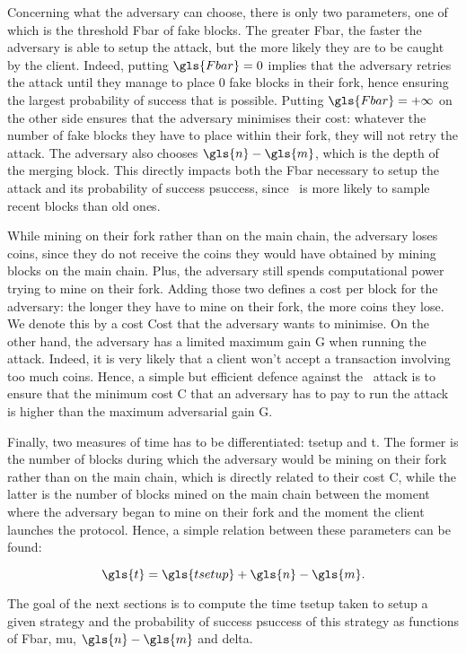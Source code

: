 Concerning what the adversary can choose, there is only two parameters, one of which is the threshold \gls{Fbar} of fake blocks. The greater \gls{Fbar}, the faster the adversary is able to setup the attack, but the more likely they are to be caught by the client. Indeed, putting \(\gls{Fbar}=0\) implies that the adversary retries the attack until they manage to place 0 fake blocks in their fork, hence ensuring the largest probability of success that is possible. Putting \(\gls{Fbar}=+\infty\) on the other side ensures that the adversary minimises their cost: whatever the number of fake blocks they have to place within their fork, they will not retry the attack. The adversary also chooses \(\gls{n}-\gls{m}\), which is the depth of the merging block. This directly impacts both the \gls{Fbar} necessary to setup the attack and its probability of success \gls{psuccess}, since \FC\ is more likely to sample recent blocks than old ones.

While mining on their fork rather than on the main chain, the adversary loses coins, since they do not receive the coins they would have obtained by mining blocks on the main chain. Plus, the adversary still spends computational power trying to mine on their fork. Adding those two defines a cost per block for the adversary: the longer they have to mine on their fork, the more coins they lose. We denote this by a cost \gls{Cost} that the adversary wants to minimise. On the other hand, the adversary has a limited maximum gain \gls{G} when running the attack. Indeed, it is very likely that a client won't accept a transaction involving too much coins. Hence, a simple but efficient defence against the \cs\ attack is to ensure that the minimum cost \gls{C} that an adversary has to pay to run the attack is higher than the maximum adversarial gain \gls{G}.

Finally, two measures of time has to be differentiated: \gls{tsetup} and \gls{t}. The former is the number of blocks during which the adversary would be mining on their fork rather than on the main chain, which is directly related to their cost \gls{C}, while the latter is the number of blocks mined on the main chain between the moment where the adversary began to mine on their fork and the moment the client launches the protocol. Hence, a simple relation between these parameters can be found:

\[\gls{t}=\gls{tsetup} + \gls{n} - \gls{m}.\]

The goal of the next sections is to compute the time \gls{tsetup} taken to setup a given strategy and the probability of success \gls{psuccess} of this strategy as functions of \gls{Fbar}, \gls{mu}, \(\gls{n}-\gls{m}\) and \gls{delta}.

